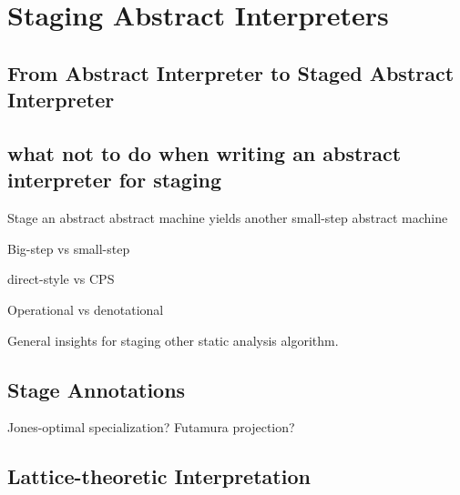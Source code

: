 \section{Staging Abstract Interpreters} \label{sai}

\subsection{From Abstract Interpreter to Staged Abstract Interpreter}

\subsection{what not to do when writing an abstract interpreter for staging}

Stage an abstract abstract machine yields another small-step abstract machine

Big-step vs small-step

direct-style vs CPS

Operational vs denotational

General insights for staging other static analysis algorithm.

\cite{10.1007/3-540-61580-6_11}

\subsection{Stage Annotations}

Jones-optimal specialization?
Futamura projection?

\subsection{Lattice-theoretic Interpretation}

